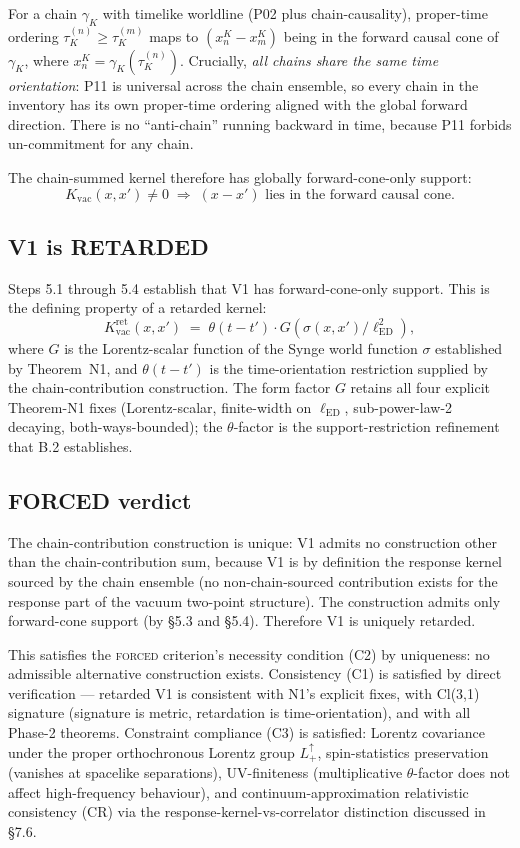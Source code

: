 \documentclass[11pt,a4paper]{article}
\begin{document}
For a chain $\gamma_K$ with timelike worldline (P02 plus chain-causality), proper-time ordering $\tau_K^{(n)} \geq \tau_K^{(m)}$ maps to $(x_n^K - x_m^K)$ being in the forward causal cone of $\gamma_K$, where $x_n^K = \gamma_K(\tau_K^{(n)})$. Crucially, \emph{all chains share the same time orientation}: P11 is universal across the chain ensemble, so every chain in the inventory has its own proper-time ordering aligned with the global forward direction. There is no ``anti-chain'' running backward in time, because P11 forbids un-commitment for any chain.

The chain-summed kernel therefore has globally forward-cone-only support:
\[
K_\mathrm{vac}(x, x') \neq 0 \;\Longrightarrow\; (x - x') \text{ lies in the forward causal cone}.
\]

\subsection{V1 is RETARDED}

Steps 5.1 through 5.4 establish that V1 has forward-cone-only support. This is the defining property of a retarded kernel:
\[
K_\mathrm{vac}^\mathrm{ret}(x, x') \;=\; \theta(t - t') \cdot G(\sigma(x, x') / \ell_\mathrm{ED}^2),
\]
where $G$ is the Lorentz-scalar function of the Synge world function $\sigma$ established by Theorem~N1, and $\theta(t-t')$ is the time-orientation restriction supplied by the chain-contribution construction. The form factor $G$ retains all four explicit Theorem-N1 fixes (Lorentz-scalar, finite-width on $\ell_\mathrm{ED}$, sub-power-law-2 decaying, both-ways-bounded); the $\theta$-factor is the support-restriction refinement that B.2 establishes.

\subsection{FORCED verdict}

The chain-contribution construction is unique: V1 admits no construction other than the chain-contribution sum, because V1 is by definition the response kernel sourced by the chain ensemble (no non-chain-sourced contribution exists for the response part of the vacuum two-point structure). The construction admits only forward-cone support (by \S5.3 and \S5.4). Therefore V1 is uniquely retarded.

This satisfies the \textsc{forced} criterion's necessity condition (C2) by uniqueness: no admissible alternative construction exists. Consistency (C1) is satisfied by direct verification --- retarded V1 is consistent with N1's explicit fixes, with Cl(3,1) signature (signature is metric, retardation is time-orientation), and with all Phase-2 theorems. Constraint compliance (C3) is satisfied: Lorentz covariance under the proper orthochronous Lorentz group $L_+^\uparrow$, spin-statistics preservation (vanishes at spacelike separations), UV-finiteness (multiplicative $\theta$-factor does not affect high-frequency behaviour), and continuum-approximation relativistic consistency (CR) via the response-kernel-vs-correlator distinction discussed in \S7.6.
\end{document}
